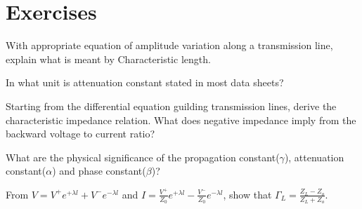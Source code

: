 \newpage
\section*{Exercises}
\begin{ExerciseList}
\Exercise[label={ex31}]
With appropriate equation of amplitude variation along a transmission line, explain what is meant by Characteristic length.

\Exercise[label={ex32}]
In what unit is attenuation constant stated in most data sheets?

\Exercise[label={ex33}]
Starting from the differential equation guilding transmission lines, derive the characteristic impedance relation. What does negative impedance imply from the backward voltage to current ratio?

\Exercise[label={ex34}]
What are the physical significance of the propagation constant($\gamma$), attenuation constant($\alpha$) and phase constant($\beta$)?

\Exercise[label={ex35}]
From $ V = V^+e^{+\lambda l} + V^-e^{-\lambda l} $ and $ I = \frac{V^+}{Z_0}e^{+\lambda l} - \frac{V^-}{Z_0}e^{-\lambda l}$, show that $ \Gamma_L = \frac{Z_L - Z_o}{Z_L + Z_o} $.
\end{ExerciseList}